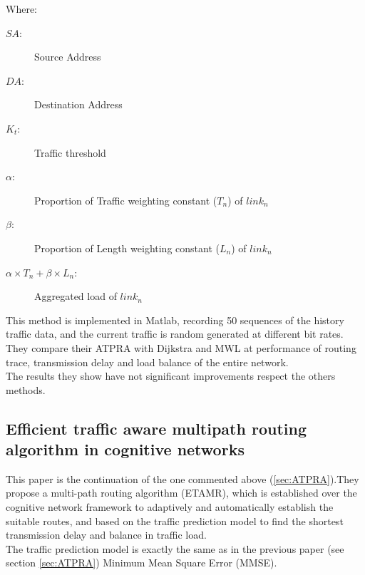 
Where:
\begin{description}
\item[$SA$:] Source Address
\item[$DA$:] Destination Address
\item[$K_{t}$:] Traffic threshold
\item[$\alpha$:] Proportion of Traffic weighting constant ($T_{n}$) of $link_{n}$  
\item[$\beta$:]  Proportion of Length weighting constant ($L_{n}$) of $link_{n}$
\item[$\alpha \times T_{n}+\beta \times L_{n}$:] Aggregated load of $link_{n}$
\end{description}


This method is implemented in Matlab, recording 50 sequences of the history traffic data, and the current traffic is random generated at different bit rates.\\

They compare their ATPRA with Dijkstra and MWL at performance of routing trace, transmission delay and load balance of the entire network.\\

The results they show have not significant improvements respect the others methods.

\subsection{Efficient traffic aware multipath routing algorithm in cognitive networks}
\label{sec:ETAMR}

This paper\cite{ETAMR} is the continuation of the one commented above (\ref{sec:ATPRA}).They propose a multi-path routing algorithm (ETAMR), which is established over the cognitive network framework to adaptively and automatically establish the suitable routes, and based on the traffic prediction model to find the shortest transmission delay and balance in traffic load.\\

The traffic prediction model is exactly the same as in the previous paper \cite{ATPRA} (see section \ref{sec:ATPRA}) Minimum Mean Square Error (MMSE).\\


